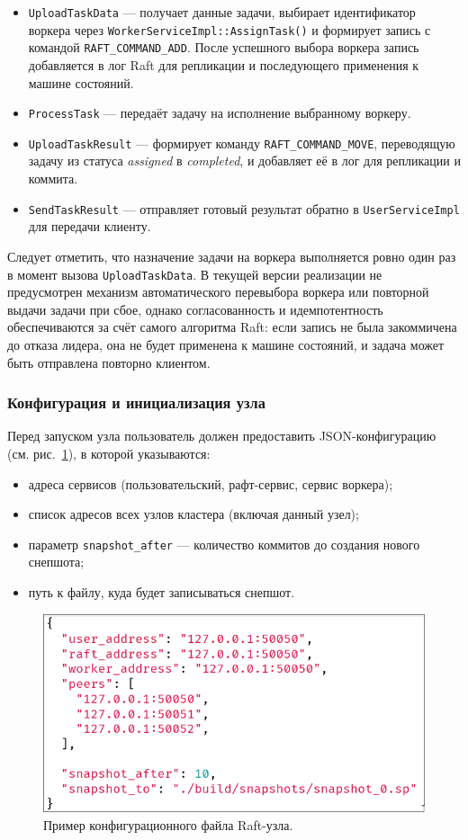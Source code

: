 \begin{itemize}
    \item \texttt{UploadTaskData} — получает данные задачи, выбирает
    идентификатор воркера через \texttt{WorkerServiceImpl::AssignTask()}
    и формирует запись с командой \texttt{RAFT\_COMMAND\_ADD}.
    После успешного выбора воркера запись добавляется в лог Raft
    для репликации и последующего применения к машине состояний.
    \item \texttt{ProcessTask} — передаёт задачу на исполнение выбранному воркеру.
    \item \texttt{UploadTaskResult} — формирует команду
    \texttt{RAFT\_COMMAND\_MOVE}, переводящую задачу из статуса
    \emph{assigned} в \emph{completed}, и добавляет её в лог для
    репликации и коммита.
    \item \texttt{SendTaskResult} — отправляет готовый результат
    обратно в \texttt{UserServiceImpl} для передачи клиенту.
\end{itemize}

Следует отметить, что назначение задачи на воркера выполняется ровно один раз в
момент вызова \texttt{UploadTaskData}. В текущей версии реализации не
предусмотрен механизм автоматического перевыбора воркера или повторной выдачи
задачи при сбое, однако согласованность и идемпотентность обеспечиваются за
счёт самого алгоритма Raft: если запись не была закоммичена до отказа лидера,
она не будет применена к машине состояний, и задача может быть отправлена
повторно клиентом.

\subsubsection{Конфигурация и инициализация узла}

Перед запуском узла пользователь должен предоставить
JSON-конфигурацию (см. рис.~\ref{fig:raftconfig}), в которой указываются:
\begin{itemize}
    \item адреса сервисов (пользовательский, рафт-сервис, сервис воркера);
    \item список адресов всех узлов кластера (включая данный узел);
    \item параметр \texttt{snapshot\_after} — количество коммитов
    до создания нового снепшота;
    \item путь к файлу, куда будет записываться снепшот.
\end{itemize}

\begin{figure}[h!]
    \centering
    \includegraphics[width=0.65\linewidth]{inc/raft_config_example.png}
    \caption{Пример конфигурационного файла Raft-узла.}
    \label{fig:raftconfig}
\end{figure}

